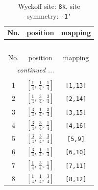 \documentclass[fleqn,8pt]{jsarticle}
\begin{document}
\renewcommand{\arraystretch}{1.2}
\begin{longtable}{ccc}
\caption{Wyckoff site: {\tt 8k}, site symmetry: {\tt -1'}}
 \\
 \hline \hline
No. & position & mapping \\ \hline \endfirsthead

\multicolumn{2}{l}{\tablename\ \thetable{}} \\
 \hline \hline
No. & position & mapping \\ \hline \endhead

 \hline \hline
\multicolumn{2}{r}{\footnotesize\it continued ...} \\ \endfoot

 \hline \hline
\multicolumn{2}{r}{} \\ \endlastfoot

1 & $\left[ \frac{1}{4},\, \frac{1}{4},\, \frac{1}{4} \right]$ & {\tt [1,13]} \\ \hline
2 & $\left[ \frac{1}{4},\, \frac{3}{4},\, \frac{3}{4} \right]$ & {\tt [2,14]} \\ \hline
3 & $\left[ \frac{3}{4},\, \frac{1}{4},\, \frac{3}{4} \right]$ & {\tt [3,15]} \\ \hline
4 & $\left[ \frac{3}{4},\, \frac{3}{4},\, \frac{1}{4} \right]$ & {\tt [4,16]} \\ \hline
5 & $\left[ \frac{3}{4},\, \frac{3}{4},\, \frac{3}{4} \right]$ & {\tt [5,9]} \\ \hline
6 & $\left[ \frac{3}{4},\, \frac{1}{4},\, \frac{1}{4} \right]$ & {\tt [6,10]} \\ \hline
7 & $\left[ \frac{1}{4},\, \frac{3}{4},\, \frac{1}{4} \right]$ & {\tt [7,11]} \\ \hline
8 & $\left[ \frac{1}{4},\, \frac{1}{4},\, \frac{3}{4} \right]$ & {\tt [8,12]} \\
\end{longtable}
\renewcommand{\arraystretch}{1.2}
\end{document}
